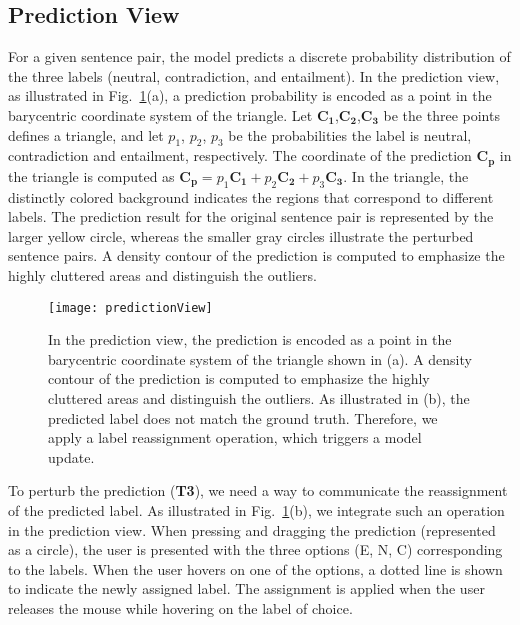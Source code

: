 
\subsection{Prediction View}
\label{sec:prediction}
For a given sentence pair, the model predicts a discrete probability distribution of the three labels (neutral, contradiction, and entailment).
%
In the prediction view, as illustrated in Fig.~\ref{fig:predictionView}(a), a prediction probability is encoded as a point in the barycentric coordinate system of the triangle. 
Let $\mathbf{C_1}$,$\mathbf{C_2}$,$\mathbf{C_3}$ be the three points defines a triangle, and let $p_1$, $p_2$, $p_3$ be the probabilities the label is neutral, contradiction and entailment, respectively. The coordinate of the prediction $\mathbf{C_p}$ in the triangle is computed as $\mathbf{C_p} = p_1\mathbf{C_1}+p_2\mathbf{C_2}+p_3\mathbf{C_3}$.
In the triangle, the distinctly colored background indicates the regions that correspond to different labels. The prediction result for the original sentence pair is represented by the larger yellow circle, whereas the smaller gray circles illustrate the perturbed sentence pairs. A density contour of the prediction is computed to emphasize the highly cluttered areas and distinguish the outliers.

\begin{figure}[htbp]
\centering
\vspace{-2mm}
 \texttt{[image: predictionView]}
 \vspace{-5mm}
 \caption{
In the prediction view, the prediction is encoded as a point in the barycentric coordinate system of the triangle shown in (a).
A density contour of the prediction is computed to emphasize the highly cluttered areas and distinguish the outliers.
As illustrated in (b), the predicted label does not match the ground truth. Therefore, we apply a label reassignment operation, which triggers a model update.
 }
  \vspace{-2mm}
\label{fig:predictionView}
\end{figure}

To perturb the prediction (\textbf{T3}), we need a way to communicate the reassignment of the predicted label. As illustrated in Fig.~\ref{fig:predictionView}(b), we integrate such an operation in the prediction view. When pressing and dragging the prediction (represented as a circle), the user is presented with the three options (E, N, C) corresponding to the labels. When the user hovers on one of the options, a dotted line is shown to indicate the newly assigned label. The assignment is applied when the user releases the mouse while hovering on the label of choice.

